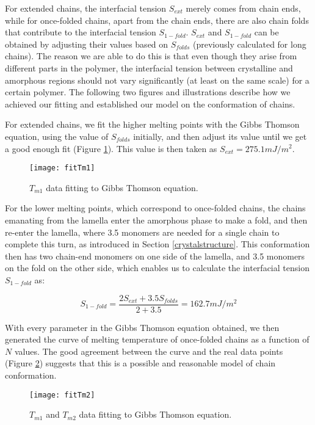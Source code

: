 For extended chains, the interfacial tension $S_{ext}$ merely comes from chain ends, while for once-folded chains, apart from the chain ends, there are also chain folds that contribute to the interfacial tension $S_{1-fold}$. $S_{ext}$ and $S_{1-fold}$ can be obtained by adjusting their values based on $S_{folds}$ (previously calculated for long chains). The reason we are able to do this is that even though they arise from different parts in the polymer, the interfacial tension between crystalline and amorphous regions should not vary significantly (at least on the same scale) for a certain polymer. The following two figures and illustrations describe how we achieved our fitting and established our model on the conformation of chains.

For extended chains, we fit the higher melting points with the Gibbs Thomson equation, using the value of $S_{folds}$ initially, and then adjust its value until we get a good enough fit (Figure \ref{fig:fitTm1}). This value is then taken as $S_{ext} = 275.1 mJ/m^2$.

\begin{figure}[H]
\center
\texttt{[image: fitTm1]}
\caption{$T_{m1}$ data fitting to Gibbs Thomson equation.}
\label{fig:fitTm1}
\end{figure}

For the lower melting points, which correspond to once-folded chains, the chains emanating from the lamella enter the amorphous phase to make a fold, and then re-enter the lamella, where 3.5 monomers are needed for a single chain to complete this turn, as introduced in Section \ref{crystalstructure}. This conformation then has two chain-end monomers on one side of the lamella, and 3.5 monomers on the fold on the other side, which enables us to calculate the interfacial tension $S_{1-fold}$ as:

\begin{equation}
\label{eqn_S1fold}
S_{1-fold} = \dfrac{2S_{ext} + 3.5 S_{folds}}{2 + 3.5} = 162.7 mJ/m^2
\end{equation}

With every parameter in the Gibbs Thomson equation obtained, we then generated the curve of melting temperature of once-folded chains as a function of $N$ values. The good agreement between the curve and the real data points (Figure \ref{fig:fitTm2}) suggests that this is a possible and reasonable model of chain conformation.

\begin{figure}[H]
\center
\texttt{[image: fitTm2]}
\caption{$T_{m1}$ and $T_{m2}$ data fitting to Gibbs Thomson equation.}
\label{fig:fitTm2}
\end{figure}

